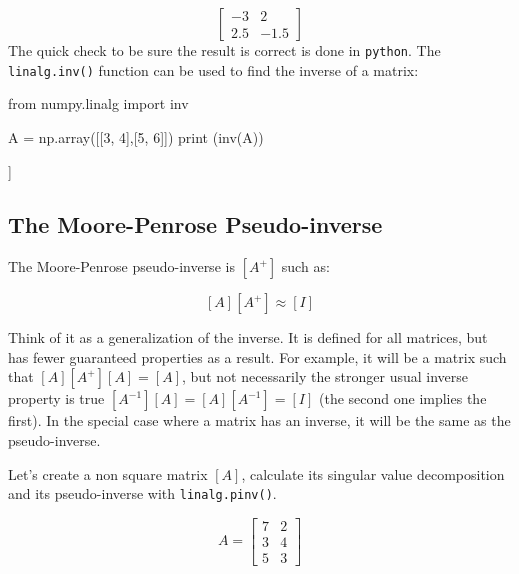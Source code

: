 \[
\begin{bmatrix}
−3 & 2\\
2.5 & −1.5
\end{bmatrix}
\]
The quick check to be sure the result is correct is done in \texttt{python}. The \texttt{linalg.inv()} function can be used to find the inverse of a matrix:

\begin{ipython}
from numpy.linalg import inv

A = np.array([[3, 4],[5, 6]])	
print (inv(A))
\end{ipython}
\begin{ioutput}
[[-3.   2. ]
 [ 2.5 -1.5]]
\end{ioutput}

\subsection{The Moore-Penrose Pseudo-inverse}
\label{the-moore-penrose-pseudoinverse}

The Moore-Penrose pseudo-inverse is \([A^+]\) such as:

\[[A][A^+]≈[I]\]

Think of it as a generalization of the inverse. It is defined for all matrices, but has fewer guaranteed properties as a result. For example, it will be a matrix such that \([𝐴][𝐴^+][𝐴]=[𝐴]\), but not necessarily the stronger usual inverse property is true \([𝐴^{−1}][𝐴]=[𝐴][𝐴^{−1}]=[𝐼]\) (the second one implies the first). In the special case where a matrix has an inverse, it will be the same as the pseudo-inverse.



Let's create a non square matrix $[A]$, calculate its singular value decomposition and its pseudo-inverse with  \texttt{linalg.pinv()}.

\[A=\begin{bmatrix}
7&2\\
3&4\\
5&3\end{bmatrix}\]

